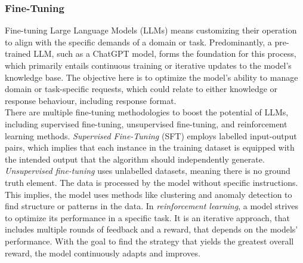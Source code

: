 \subsubsection*{Fine-Tuning}\label{sec:fine-tuning-def}
Fine-tuning Large Language Models (LLMs) means customizing their operation to align with the specific demands of a domain or task. Predominantly, a pre-trained LLM, such as a ChatGPT model, forms the foundation for this process, which primarily entails continuous training or iterative updates to the model's knowledge base. The objective here is to optimize the model's ability to manage domain or task-specific requests, which could relate to either knowledge or response behaviour, including response format.\\
There are multiple fine-tuning methodologies to boost the potential of LLMs, including supervised fine-tuning, unsupervised fine-tuning, and reinforcement learning methods. \emph{Supervised Fine-Tuning} (SFT) employs labelled input-output pairs, which implies that each instance in the training dataset is equipped with the intended output that the algorithm should independently generate. \emph{Unsupervised fine-tuning} uses unlabelled datasets, meaning there is no ground truth element. The data is processed by the model without specific instructions. This implies, the model uses methods like clustering and anomaly detection to find structure or patterns in the data. In \emph{reinforcement learning}, a model strives to optimize its performance in a specific task. It is an iterative approach, that includes multiple rounds of feedback and a reward, that  depends on the models' performance. With the goal to find the strategy that yields the greatest overall reward, the model continuously adapts and improves.

